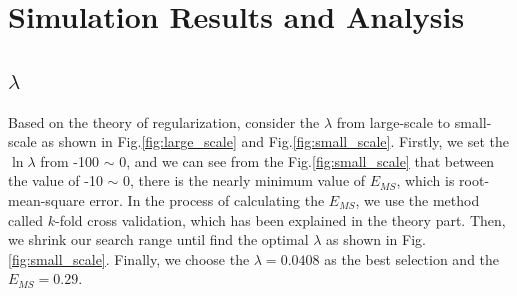 \documentclass[letterpaper,12pt]{article}
\numberwithin{equation}{section}
\begin{document}
\section{Simulation Results and Analysis}

\subsection{$\lambda$}
Based on the theory of regularization, consider the $\lambda$ from large-scale to small-scale as shown in Fig.\ref{fig:large_scale} and Fig.\ref{fig:small_scale}. Firstly, we set the $\ln{\lambda}$ from -100 $\sim$ 0, and we can see from the Fig.\ref{fig:small_scale} that between the value of -10 $\sim$ 0, there is the nearly minimum value of $E_{MS}$, which is root-mean-square error. In the process of calculating the $E_{MS}$, we use the method called $k$-fold cross validation, which has been explained in the theory part. Then, we shrink our search range until find the optimal $\lambda$ as shown in Fig.\ref{fig:small_scale}. Finally, we choose the $\lambda=0.0408$ as the best selection and the $E_{MS}=0.29$. %
\end{document}
